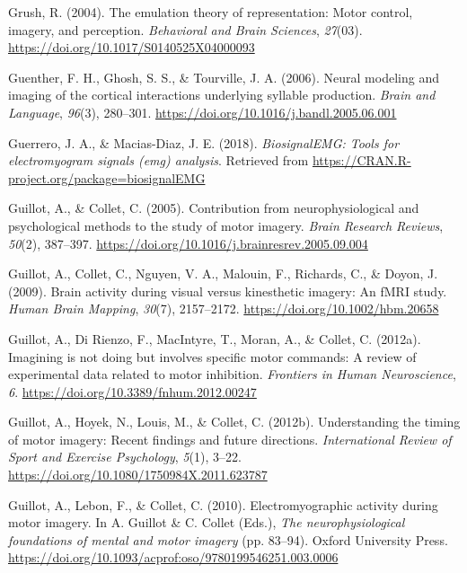 \documentclass[a4paper,12pt,twoside,onecolumn,openright,final,oldfontcommands]{memoir}
\begin{document}
\leavevmode\hypertarget{ref-grush_emulation_2004}{}%
Grush, R. (2004). The emulation theory of representation: Motor control, imagery, and perception. \emph{Behavioral and Brain Sciences}, \emph{27}(03). \url{https://doi.org/10.1017/S0140525X04000093}

\leavevmode\hypertarget{ref-guenther_neural_2006}{}%
Guenther, F. H., Ghosh, S. S., \& Tourville, J. A. (2006). Neural modeling and imaging of the cortical interactions underlying syllable production. \emph{Brain and Language}, \emph{96}(3), 280--301. \url{https://doi.org/10.1016/j.bandl.2005.06.001}

\leavevmode\hypertarget{ref-R-biosignalEMG}{}%
Guerrero, J. A., \& Macias-Diaz, J. E. (2018). \emph{BiosignalEMG: Tools for electromyogram signals (emg) analysis}. Retrieved from \url{https://CRAN.R-project.org/package=biosignalEMG}

\leavevmode\hypertarget{ref-guillot_contribution_2005}{}%
Guillot, A., \& Collet, C. (2005). Contribution from neurophysiological and psychological methods to the study of motor imagery. \emph{Brain Research Reviews}, \emph{50}(2), 387--397. \url{https://doi.org/10.1016/j.brainresrev.2005.09.004}

\leavevmode\hypertarget{ref-guillot_brain_2009}{}%
Guillot, A., Collet, C., Nguyen, V. A., Malouin, F., Richards, C., \& Doyon, J. (2009). Brain activity during visual versus kinesthetic imagery: An fMRI study. \emph{Human Brain Mapping}, \emph{30}(7), 2157--2172. \url{https://doi.org/10.1002/hbm.20658}

\leavevmode\hypertarget{ref-guillot_imagining_2012}{}%
Guillot, A., Di Rienzo, F., MacIntyre, T., Moran, A., \& Collet, C. (2012a). Imagining is not doing but involves specific motor commands: A review of experimental data related to motor inhibition. \emph{Frontiers in Human Neuroscience}, \emph{6}. \url{https://doi.org/10.3389/fnhum.2012.00247}

\leavevmode\hypertarget{ref-guillot_understanding_2012}{}%
Guillot, A., Hoyek, N., Louis, M., \& Collet, C. (2012b). Understanding the timing of motor imagery: Recent findings and future directions. \emph{International Review of Sport and Exercise Psychology}, \emph{5}(1), 3--22. \url{https://doi.org/10.1080/1750984X.2011.623787}

\leavevmode\hypertarget{ref-guillot_electromyographic_2010}{}%
Guillot, A., Lebon, F., \& Collet, C. (2010). Electromyographic activity during motor imagery. In A. Guillot \& C. Collet (Eds.), \emph{The neurophysiological foundations of mental and motor imagery} (pp. 83--94). Oxford University Press. \url{https://doi.org/10.1093/acprof:oso/9780199546251.003.0006}
\end{document}
